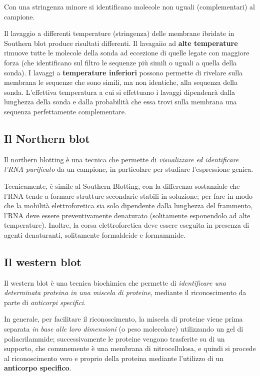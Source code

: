 \documentclass[]{article}
\begin{document}
Con una stringenza minore si identificano molecole non uguali
(complementari) al campione.

Il lavaggio a differenti temperature (stringenza) delle membrane
ibridate in Southern blot produce risultati differenti. Il lavagaiio ad
\textbf{alte temperature} rimuove tutte le molecole della sonda ad
eccezione di quelle legate con maggiore forza (che identificano sul
filtro le sequenze più simili o uguali a quella della sonda). I lavaggi
a \textbf{temperature inferiori} possono permette di rivelare sulla
membrana le sequenze che sono simili, ma non identiche, alla sequenza
della sonda. L'effettiva temperatura a cui si effettuano i lavaggi
dipendenrà dalla lunghezza della sonda e dalla probabilità che essa
trovi sulla membrana una sequenza perfettamente complementare.

\subsection{Il Northern blot}\label{il-northern-blot}

Il northern blotting è una tecnica che permette di \emph{visualizzare ed
identificare l'RNA purificato} da un campione, in particolare per
studiare l'espressione genica.

Tecnicamente, è simile al Southern Blotting, con la differenza
sostanziale che l'RNA tende a formare strutture secondarie stabili in
soluzione; per fare in modo che la mobilità elettroforetica sia solo
dipendente dalla lunghezza del frammento, l'RNA deve essere
preventivamente denaturato (solitamente esponendolo ad alte
temperature). Inoltre, la corsa elettroforetica deve essere eseguita in
presenza di agenti denaturanti, solitamente formaldeide e formammide.

\subsection{Il western blot}\label{il-western-blot}

Il western blot è una tecnica biochimica che permette di
\emph{identificare una determinata proteina in una miscela di proteine},
mediante il riconoscimento da parte di \emph{anticorpi specifici}.

In generale, per facilitare il riconoscimento, la miscela di proteine
viene prima separata \emph{in base alle loro dimensioni} (o peso
molecolare) utilizzando un gel di poliacrilammide; successivamente le
proteine vengono trasferite su di un supporto, che comunemente è una
membrana di nitrocellulosa, e quindi si procede al riconoscimento vero e
proprio della proteina mediante l'utilizzo di un \textbf{anticorpo
specifico}.
\end{document}
